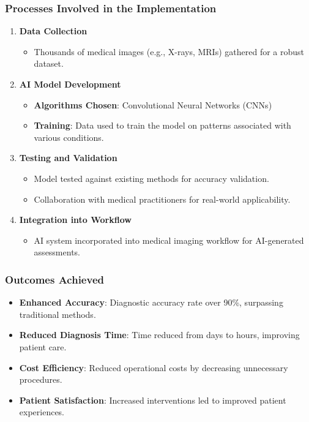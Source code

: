 \documentclass{beamer}
\begin{document}
\begin{frame}[fragile]
    \frametitle{Processes Involved in the Implementation}
    \begin{enumerate}
        \item \textbf{Data Collection}
            \begin{itemize}
                \item Thousands of medical images (e.g., X-rays, MRIs) gathered for a robust dataset.
            \end{itemize}
        
        \item \textbf{AI Model Development}
            \begin{itemize}
                \item \textbf{Algorithms Chosen}: Convolutional Neural Networks (CNNs)
                \item \textbf{Training}: Data used to train the model on patterns associated with various conditions.
            \end{itemize}

        \item \textbf{Testing and Validation}
            \begin{itemize}
                \item Model tested against existing methods for accuracy validation.
                \item Collaboration with medical practitioners for real-world applicability.
            \end{itemize}

        \item \textbf{Integration into Workflow}
            \begin{itemize}
                \item AI system incorporated into medical imaging workflow for AI-generated assessments.
            \end{itemize}
    \end{enumerate}
\end{frame}

\begin{frame}[fragile]
    \frametitle{Outcomes Achieved}
    \begin{itemize}
        \item \textbf{Enhanced Accuracy}: Diagnostic accuracy rate over 90\%, surpassing traditional methods.
        \item \textbf{Reduced Diagnosis Time}: Time reduced from days to hours, improving patient care.
        \item \textbf{Cost Efficiency}: Reduced operational costs by decreasing unnecessary procedures.
        \item \textbf{Patient Satisfaction}: Increased interventions led to improved patient experiences.
    \end{itemize}
\end{frame}
\end{document}
